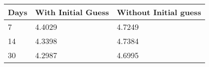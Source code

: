 \begin{tabular}{lll}
Days & With Initial Guess & Without Initial guess \\ 
\hline 
7 & 4.4029 & 4.7249 \\ 
14 & 4.3398 & 4.7384 \\ 
30 & 4.2987 & 4.6995 \\ 
\hline 
\end{tabular}